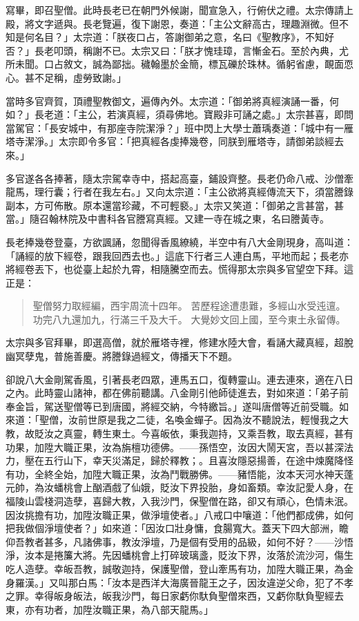 寫畢，即召聖僧。此時長老已在朝門外候謝，聞宣急入，行俯伏之禮。太宗傳請上殿，將文字遞與。長老覽遍，復下謝恩，奏道：「主公文辭高古，理趣淵微。但不知是何名目？」太宗道：「朕夜口占，答謝御弟之意，名曰《聖教序》，不知好否？」長老叩頭，稱謝不已。太宗又曰：「朕才愧珪璋，言慚金石。至於內典，尤所未聞。口占敘文，誠為鄙拙。穢翰墨於金簡，標瓦礫於珠林。循躬省慮，靦面恧心。甚不足稱，虛勞致謝。」

當時多官齊賀，頂禮聖教御文，遍傳內外。太宗道：「御弟將真經演誦一番，何如？」長老道：「主公，若演真經，須尋佛地。寶殿非可誦之處。」太宗甚喜，即問當駕官：「長安城中，有那座寺院潔淨？」班中閃上大學士蕭瑀奏道：「城中有一雁塔寺潔淨。」太宗即令多官：「把真經各虔捧幾卷，同朕到雁塔寺，請御弟談經去來。」

多官遂各各捧著，隨太宗駕幸寺中，搭起高臺，鋪設齊整。長老仍命八戒、沙僧牽龍馬，理行囊；行者在我左右。」又向太宗道：「主公欲將真經傳流天下，須當謄錄副本，方可佈散。原本還當珍藏，不可輕褻。」太宗又笑道：「御弟之言甚當，甚當。」隨召翰林院及中書科各官謄寫真經。又建一寺在城之東，名曰謄黃寺。

長老捧幾卷登臺，方欲諷誦，忽聞得香風繚繞，半空中有八大金剛現身，高叫道：「誦經的放下經卷，跟我回西去也。」這底下行者三人連白馬，平地而起；長老亦將經卷丟下，也從臺上起於九霄，相隨騰空而去。慌得那太宗與多官望空下拜。這正是：
\begin{quote}
聖僧努力取經編，西宇周流十四年。
苦歷程途遭患難，多經山水受迍邅。
功完八九還加九，行滿三千及大千。
大覺妙文回上國，至今東土永留傳。
\end{quote}

太宗與多官拜畢，即選高僧，就於雁塔寺裡，修建水陸大會，看誦大藏真經，超脫幽冥孽鬼，普施善慶。將謄錄過經文，傳播天下不題。

卻說八大金剛駕香風，引著長老四眾，連馬五口，復轉靈山。連去連來，適在八日之內。此時靈山諸神，都在佛前聽講。八金剛引他師徒進去，對如來道：「弟子前奉金旨，駕送聖僧等已到唐國，將經交納，今特繳旨。」遂叫唐僧等近前受職。如來道：「聖僧，汝前世原是我之二徒，名喚金蟬子。因為汝不聽說法，輕慢我之大教，故貶汝之真靈，轉生東土。今喜皈依，秉我迦持，又乘吾教，取去真經，甚有功果，加陞大職正果，汝為旃檀功德佛。——孫悟空，汝因大鬧天宮，吾以甚深法力，壓在五行山下，幸天災滿足，歸於釋教；。且喜汝隱惡揚善，在途中煉魔降怪有功，全終全始，加陞大職正果，汝為鬥戰勝佛。——豬悟能，汝本天河水神天蓬元帥，為汝蟠桃會上酗酒戲了仙娥，貶汝下界投胎，身如畜類。幸汝記愛人身，在福陵山雲棧洞造孽，喜歸大教，入我沙門，保聖僧在路，卻又有頑心，色情未泯。因汝挑擔有功，加陞汝職正果，做淨壇使者。」八戒口中嚷道：「他們都成佛，如何把我做個淨壇使者？」如來道：「因汝口壯身慵，食腸寬大。蓋天下四大部洲，瞻仰吾教者甚多，凡諸佛事，教汝淨壇，乃是個有受用的品級，如何不好？——沙悟淨，汝本是捲簾大將。先因蟠桃會上打碎玻璃盞，貶汝下界，汝落於流沙河，傷生吃人造孽。幸皈吾教，誠敬迦持，保護聖僧，登山牽馬有功，加陞大職正果，為金身羅漢。」又叫那白馬：「汝本是西洋大海廣晉龍王之子，因汝違逆父命，犯了不孝之罪。幸得皈身皈法，皈我沙門，每日家虧你馱負聖僧來西，又虧你馱負聖經去東，亦有功者，加陞汝職正果，為八部天龍馬。」

